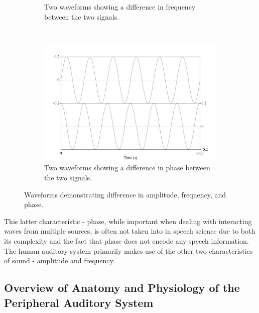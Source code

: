 \documentclass[dissertation,copyright]{uathesis}
\begin{document}
\begin{figure}[h!]
\begin{subfigure}{0.5\textwidth}
  \caption{Two waveforms showing a difference in frequency between the two signals.}
  \label{fig:basic-sound-frequency}
\end{subfigure}
%
\\[2ex]
\begin{center}
\begin{subfigure}{0.5\textwidth}
  \includegraphics[width=\textwidth]{figure/basic-sound-phase.png}
  \caption{Two waveforms showing a difference in phase between the two signals.}
  \label{fig:basic-sound-phase}
\end{subfigure}
\end{center}
\caption{Waveforms demonstrating difference in amplitude, frequency, and phase.}
\label{fig:basic-sound-wave}
\end{figure}

This latter characteristic - phase, while important when dealing with interacting waves from multiple sources, is often not taken into in speech science due to both its complexity and the fact that phase does not encode any speech information.  The human auditory system primarily makes use of the other two characteristics of sound - amplitude and frequency.

\subsection{Overview of Anatomy and Physiology of the Peripheral Auditory System}
\end{document}
